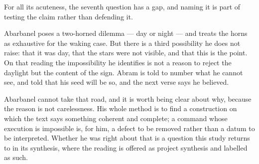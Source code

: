 For all its acuteness, the seventh question has a gap, and naming it is part of
testing the claim rather than defending it.

Abarbanel poses a two-horned dilemma --- day or night --- and treats the horns
as exhaustive for the waking case. But there is a third possibility he does not
raise: that it was day, that the stars were not visible, and that this is the
point. On that reading the impossibility he identifies is not a reason to reject
the daylight but the content of the sign. Abram is told to number what he cannot
see, and told that his seed will be so, and the next verse says he believed.

Abarbanel cannot take that road, and it is worth being clear about why, because
the reason is not carelessness. His whole method is to find a construction on
which the text says something coherent and complete; a command whose execution
is impossible is, for him, a defect to be removed rather than a datum to be
interpreted. Whether he was right about that is a question this study returns to
in its synthesis, where the reading is offered as project synthesis and labelled
as such.
